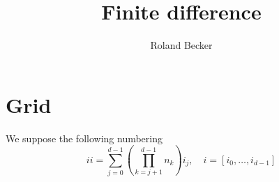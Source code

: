\documentclass[12pt, english]{article}
\title{Finite difference}
\author{Roland Becker}
\begin{document}
\maketitle
%
%
\section{Grid}\label{sec:}
%
We suppose the following numbering
%
\begin{equation}\label{eq:}
ii = \sum_{j=0}^{d-1}\left(\prod_{k=j+1}^{d-1}n_k\right) i_j,\quad i=[i_0,\ldots,i_{d-1}]
\end{equation}
%
%

\end{document}
